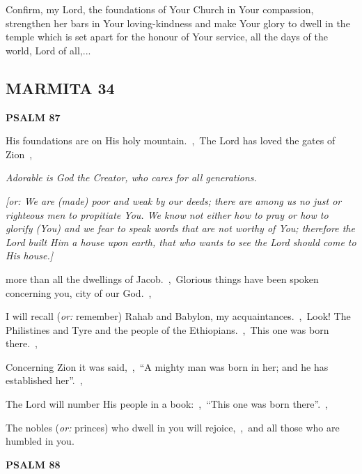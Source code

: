 \documentclass[12pt,twoside,a5paper]{article}
\newcommand{\marmita}[1]{\subsection*{MARMITA {#1}}}
\newcommand{\psalm}[1]{\textbf{PSALM {#1}}\nopagebreak}
\newcommand{\qanona}[1]{{\liturgicalhint{Qanona.} \emph{#1}}}
\newcommand{\slota}[1]{\liturgicalhint{Slota.} #1}
\newcommand{\translationoption}[1]{\emph{or:} #1}
\begin{document}
\slota{Confirm, my Lord, the foundations of Your Church in Your compassion, strengthen her bars in Your loving-kindness and make Your glory to dwell in the temple which is set apart for the honour of Your service, all the days of the world, Lord of all,...}

\marmita{34}

\psalm{87}

\begin{normalparskip}
  His foundations are on His holy mountain.~\sep\ The Lord has loved the gates of Zion~\sep

  \qanona{Adorable is God the Creator, who cares for all generations.}

  \emph{[\translationoption{We are (made) poor and weak by our deeds; there are among us no just or righteous men to propitiate You. We know not either how to pray or how to glorify (You) and we fear to speak words that are not worthy of You; therefore the Lord built Him a house upon earth, that who wants to see the Lord should come to His house.}]}

  more than all the dwellings of Jacob.~\sep\ Glorious things have been spoken concerning you, city of our God.~\sep

  I will recall (\translationoption{remember}) Rahab and Babylon, my acquaintances.~\sep\ Look! The Philistines and Tyre and the people of the Ethiopians.~\sep\ This one was born there.~\sep

  Concerning Zion it was said,~\sep\ ``A mighty man was born in her; and he has established her''.~\sep

  The Lord will number His people in a book:~\sep\ ``This one was born there''.~\sep

  The nobles (\translationoption{princes}) who dwell in you will rejoice,~\sep\ and all those who are humbled in you.
\end{normalparskip}

\psalm{88}
\end{document}
